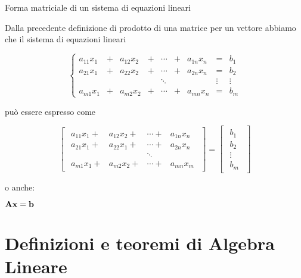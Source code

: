 \documentclass{beamer}
\begin{document}
\begin{frame}{Forma matriciale di un sistema di equazioni lineari}

\scriptsize{
 Dalla precedente definizione di prodotto di una matrice per un vettore abbiamo che il sistema di equazioni lineari

\[
\left\{\begin{array}{lclccclcc}
  a_{11} x_1 &+& a_{12} x_2 &+& \cdots &+& a_{1n} x_n &=& b_1\\
  a_{21} x_1 &+& a_{22} x_2 &+& \cdots &+& a_{2n} x_n &=& b_2\\
             & &            & & \ddots & &            &\vdots& \vdots\\
  a_{m1} x_1 &+& a_{m2} x_2 &+& \cdots &+& a_{mn} x_n &=& b_m
\end{array}\right.
\]

può essere espresso come

\[
\begin{bmatrix}\begin{array}{cccc}
  a_{11} x_{1} +& a_{12} x_{2} +& \cdots +& a_{1n} x_{n}\\
  a_{21} x_{1} +& a_{22} x_{1} +& \cdots +& a_{2n} x_{n}\\
         &        & \ddots \\
  a_{m1} x_{1} +& a_{m2} x_{2} +& \cdots +& a_{mn} x_{m}
\end{array}\end{bmatrix} 
=
  \begin{bmatrix}\begin{array}{c}
  b_{1}\\
  b_{2}\\
  \vdots \\
  b_{m}
  \end{array}\end{bmatrix}
\]

o anche: \begin{center}{$\mathbf{A} \mathbf{x} = \mathbf{b}$}\end{center}
}
\end{frame}

\section{Definizioni e teoremi di Algebra Lineare}
\end{document}
